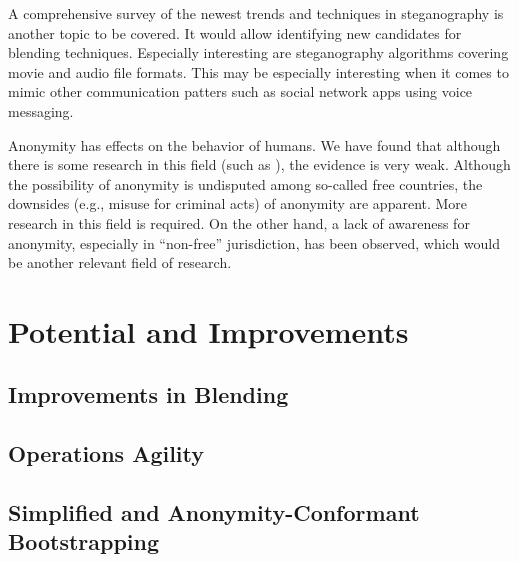 A comprehensive survey of the newest trends and techniques in steganography is another topic to be covered. It would allow identifying new candidates for blending techniques. Especially interesting are steganography algorithms covering movie and audio file formats. This may be especially interesting when it comes to mimic other communication patters such as social network apps using voice messaging.

Anonymity has effects on the behavior of humans. We have found that although there is some research in this field (such as \cite{postmes2001social}), the evidence is very weak. Although the possibility of anonymity is undisputed among so-called free countries, the downsides (e.g., misuse for criminal acts) of anonymity are apparent. More research in this field is required. On the other hand, a lack of awareness for anonymity, especially in ``non-free'' jurisdiction, has been observed, which would be another relevant field of research. 

\chapter{Potential and Improvements}
\section{Improvements in Blending}
\newpage

\section{Operations Agility}
\section{Simplified and Anonymity-Conformant Bootstrapping}
